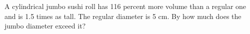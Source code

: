 A cylindrical jumbo sushi roll has 116 percent more volume than a regular one and is 1.5 times as tall. The regular diameter is 5 cm. By how much does the jumbo diameter exceed it?
